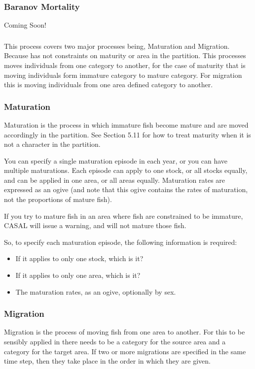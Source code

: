 \subsubsection*{Baranov Mortality}
Coming Soon!

\subsubsection{}
This process covers two major processes being, Maturation and Migration. Because \CNAME has not constraints on maturity or area in the partition. This processes moves individuals from one category to another, for the case of maturity that is moving individuals form immature category to mature category. For migration this is moving individuals from one area defined category to another.

\subsubsection*{Maturation}
Maturation is the process in which immature fish become mature and are moved accordingly in the partition. See Section 5.11 for how to treat maturity when it is not a character in the partition.

You can specify a single maturation episode in each year, or you can have multiple maturations. Each episode can apply to one stock, or all stocks equally, and can be applied in one area, or all areas equally. Maturation rates are expressed as an ogive (and note that this ogive contains the rates of maturation, not the proportions of mature fish).

If you try to mature fish in an area where fish are constrained to be immature, CASAL will issue a warning, and will not mature those fish.

So, to specify each maturation episode, the following information is required: 

\begin{itemize}
\item If it applies to only one stock, which is it?
\item If it applies to only one area, which is it?
\item The maturation rates, as an ogive, optionally by sex.
\end{itemize}




\subsubsection*{Migration}
Migration is the process of moving fish from one area to another. For this to be sensibly applied in \CNAME there needs to be a category for the source area and a category for the target area. If two or more migrations are specified in the same time step, then they take place in the order in which they are given.

